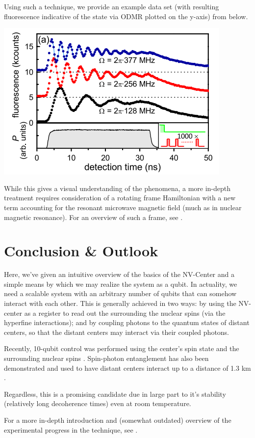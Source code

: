 \documentclass[10pt,a4paper]{article}
\begin{document}
\begin{multicols}{2}
Using such a technique, we provide an example data set (with resulting fluorescence indicative of the state via ODMR plotted on the y-axis) from \cite{PhysRevLett.105.177403} below.

\begin{center}
\includegraphics[scale=1]{rabi.png}
\end{center}
While this gives a visual understanding of the phenomena, a more in-depth treatment requires consideration of a rotating frame Hamiltonian with a new term accounting for the resonant microwave magnetic field (much as in nuclear magnetic resonance). For an overview of such a frame, see \cite{PhysRevB.84.161403}.


\section{Conclusion \& Outlook}
Here, we've given an intuitive overview of the basics of the NV-Center and a simple means by which we may realize the system as a qubit. In actuality, we need a scalable system with an arbitrary number of qubits that can somehow interact with each other. This is generally achieved in two ways: by using the NV-center as a register to read out the surrounding the nuclear spins (via the hyperfine interactions); and by coupling photons to the quantum states of distant centers, so that the distant centers may interact via their coupled photons. 

Recently, 10-qubit control was performed using the center's spin state and the surrounding nuclear spins \cite{PhysRevX.9.031045}.
Spin-photon entanglement has also been demonstrated and used to have distant centers interact up to a distance of 1.3 km \cite{nemoto2016photonic}.


Regardless, this is a promising candidate due in large part to it's stability (relatively long decoherence times) even at room temperature.

For a more in-depth introduction and (somewhat outdated) overview of the experimental progress in the technique, see
\cite{childress2013diamond}.
\end{multicols}

\nocite{*}



 
\end{document}
